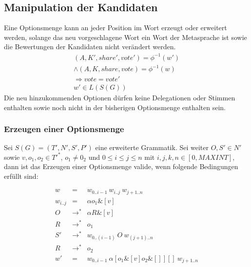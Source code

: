 \documentclass[a4paper,12pt]{report}
\begin{document}
% 
% 
% 
% 




\subsection{Manipulation der Kandidaten}
\label{manipulationkandidaten}
Eine Optionsmenge kann an jeder Position im Wort erzeugt oder erweitert werden, solange das neu vorgeschlagene Wort ein Wort der Metasprache ist sowie die Bewertungen der Kandidaten nicht verändert werden.
\begin{eqnarray}
(A,K',share',vote') = \phi^{-1}(w') \nonumber\\
\land (A,K,share,vote) = \phi^{-1}(w) \nonumber\\
\Rightarrow vote = vote' \\
  w'\in L(S(G))
\end{eqnarray}
Die neu hinzukommenden Optionen dürfen keine Delegationen oder Stimmen enthalten sowie noch nicht in der bisherigen Optionsmenge enthalten sein.

\subsubsection*{Erzeugen einer Optionsmenge}

Sei $S(G) = (T', N', S', P')$ eine erweiterte Grammatik. Sei weiter $O,S'\in N'$ sowie $v,o_1,o_2 \in T'^*$, $o_1\neq 0_2$ und $0\leq i\leq j\leq n$ mit $i,j,k,n \in [0,MAXINT]$, dann ist das Erzeugen einer Optionsmenge valide, wenn folgende Bedingungen erfüllt sind:

\begin{eqnarray}
  w &=& w_{0 .. i-1}\ w_{i..j}\ w_{j+1 .. n} \\
  w_{i..j} &=& \alpha o_1 \& [v] \\
  O &\rightarrow^*& \alpha R \& [v] \\
  R &\rightarrow^*& o_1 \\
  S' &\rightarrow^*& w_{0 .. (i-1)}\ O\ w_{(j+1) .. n}\\
  R &\rightarrow^*& o_2 \\
  w' &=& w_{0..i-1}\ \alpha [o_1\& [v] o_2\& []][]\ w_{j+1 .. n}
\end{eqnarray}
\end{document}
